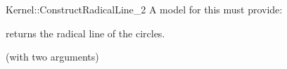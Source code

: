 \begin{ccRefFunctionObjectConcept}{Kernel::ConstructRadicalLine_2}
A model for this must provide:


       {returns the radical line of the circles.
	}

\ccRefines
{} (with two arguments)

\ccSeeAlso
{} \\

\end{ccRefFunctionObjectConcept}

